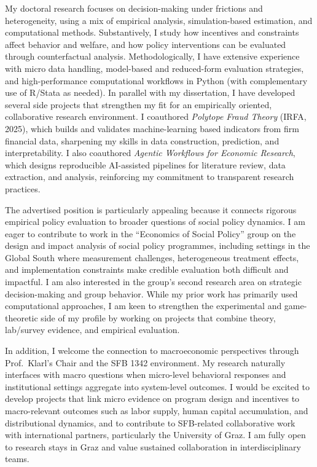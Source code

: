 \documentclass[11pt]{article}
\begin{document}
My doctoral research focuses on decision-making under frictions and heterogeneity, using a mix of empirical analysis, simulation-based estimation, and computational methods. 
Substantively, I study how incentives and constraints affect behavior and welfare, and how policy interventions can be evaluated through counterfactual analysis. 
Methodologically, I have extensive experience with micro data handling, model-based and reduced-form evaluation strategies, and high-performance computational workflows in Python (with complementary use of R/Stata as needed). 
In parallel with my dissertation, I have developed several side projects that strengthen my fit for an empirically oriented, collaborative research environment. I coauthored \textit{Polytope Fraud Theory} (IRFA, 2025), which builds and validates machine-learning based indicators from firm financial data, sharpening my skills in data construction, prediction, and interpretability. I also coauthored \textit{Agentic Workflows for Economic Research}, which designs reproducible AI-assisted pipelines for literature review, data extraction, and analysis, reinforcing my commitment to transparent research practices. 

The advertised position is particularly appealing because it connects rigorous empirical policy evaluation to broader questions of social policy dynamics. 
I am eager to contribute to work in the ``Economics of Social Policy'' group on the design and impact analysis of social policy programmes, including settings in the Global South where measurement challenges, heterogeneous treatment effects, and implementation constraints make credible evaluation both difficult and impactful. 
I am also interested in the group's second research area on strategic decision-making and group behavior. 
While my prior work has primarily used computational approaches, I am keen to strengthen the experimental and game-theoretic side of my profile by working on projects that combine theory, lab/survey evidence, and empirical evaluation.

In addition, I welcome the connection to macroeconomic perspectives through Prof.\ Klarl's Chair and the SFB 1342 environment. 
My research naturally interfaces with macro questions when micro-level behavioral responses and institutional settings aggregate into system-level outcomes. 
I would be excited to develop projects that link micro evidence on program design and incentives to macro-relevant outcomes such as labor supply, human capital accumulation, and distributional dynamics, and to contribute to SFB-related collaborative work with international partners, particularly the University of Graz. 
I am fully open to research stays in Graz and value sustained collaboration in interdisciplinary teams.
\end{document}

